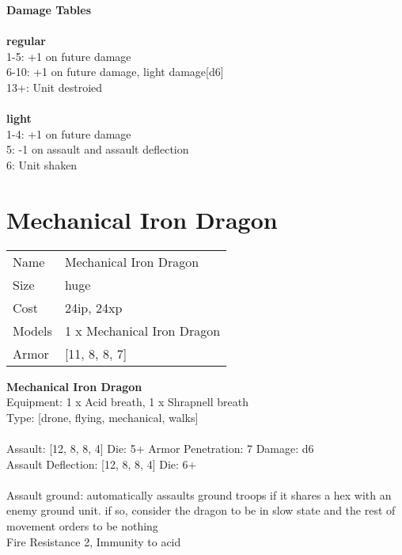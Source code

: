 {\bf Damage Tables} \\
\ \\ {\bf regular } \\
1-5: +1 on future damage \\
6-10: +1 on future damage, light damage[d6] \\
13+: Unit destroied \\
\ \\ {\bf light } \\
1-4: +1 on future damage \\
5: -1 on assault and assault deflection \\
6: Unit shaken \\










\pagebreak\pagebreak

\section{ Mechanical Iron Dragon }

\begin{tabular}{ll}
  Name & Mechanical Iron Dragon \\
  Size & huge\\
  Cost & 24ip, 24xp\\
  Models & 1 x Mechanical Iron Dragon\\
  Armor & [11, 8, 8, 7]\\
\end{tabular}

\noindent 

{\bf Mechanical Iron Dragon } \\
Equipment: 1 x Acid breath, 1 x Shrapnell breath \\
Type: [drone, flying, mechanical, walks] \\
\ \\
Assault: [12, 8, 8, 4] Die: 5+ Armor Penetration: 7 Damage: d6 \\
Assault Deflection: [12, 8, 8, 4] Die: 6+\\
\indent  
\ \\
Assault ground: automatically assaults ground troops if it shares a hex with an enemy ground unit. if so, consider the dragon to be in slow state and the rest of movement orders to be nothing\\ 
Fire Resistance 2, Immunity to acid\\ 

